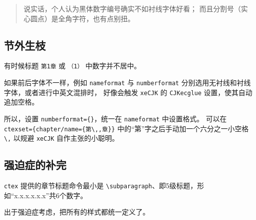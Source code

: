 \documentclass[../Main/thesis.tex]{subfiles}
\begin{document}
\begin{quote}
说实话，个人认为黑体数字编号确实不如衬线字体好看；
而且分割号（实心圆点）是全角字符，也有点别扭。
\end{quote}

\subsection{节外生枝}

有时候标题 \texttt{第1章} 或 \texttt{（1）} 中数字并不居中。

如果前后字体不一样，例如 \texttt{nameformat} 与 \texttt{numberformat}
分别选用无衬线和衬线字体，或者进行中英文混排时， 好像会触发
\texttt{xeCJK} 的 \texttt{CJKecglue} 设置，使其自动追加空格。

所以，设置 \texttt{numberformat=\{\}}，统一在 \texttt{nameformat}
中设置格式。 可以在
\texttt{ctexset=\{chapter/name=\{第\textbackslash{},,章\}\}}
中的``第''字之后手动加一个六分之一小空格 \texttt{\textbackslash{},}
以规避 \texttt{xeCJK} 自作主张的小聪明。

\subsection{强迫症的补完}

\texttt{ctex} 提供的章节标题命令最小是
\texttt{\textbackslash{}subparagraph}、即5级标题，形如``x.x.x.x.x.x''共6个数字。

出于强迫症考虑，把所有的样式都统一定义了。
\end{document}
